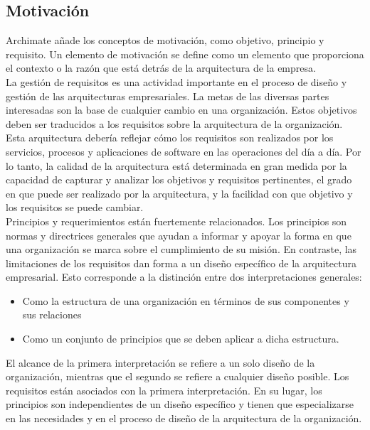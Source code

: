   \subsection{Motivación}
  Archimate añade los conceptos de motivación, como objetivo, principio y requisito. Un elemento de motivación se define como un elemento que proporciona el contexto o la razón que está detrás de la arquitectura de la empresa. \\
  
  La gestión de requisitos es una actividad importante en el proceso de diseño y gestión de las arquitecturas empresariales. La metas de las diversas partes interesadas son la base de cualquier cambio en una organización. Estos objetivos deben ser traducidos a los requisitos sobre la arquitectura de la organización. Esta arquitectura debería reflejar cómo los requisitos son realizados por los servicios, procesos y aplicaciones de software en las operaciones del día a día. Por lo tanto, la calidad de la arquitectura está determinada en gran medida por la capacidad de capturar y analizar los objetivos y requisitos pertinentes, el grado en que puede ser realizado por la arquitectura, y la facilidad con que objetivo y los requisitos se puede cambiar. \\
  
  Principios y requerimientos están fuertemente relacionados. Los principios son normas y directrices generales que ayudan a informar y apoyar la forma en que una organización se marca sobre el cumplimiento de su misión. En contraste, las limitaciones de los requisitos dan forma a un diseño específico de la arquitectura empresarial. Esto corresponde a la distinción entre dos interpretaciones generales:
  \begin{itemize}
  	\item Como la estructura de una organización en términos de sus componentes y sus relaciones
  	\item Como un conjunto de principios que se deben aplicar a dicha estructura.
  \end{itemize}
  El alcance de la primera interpretación se refiere a un solo diseño de la organización, mientras que el segundo se refiere a cualquier diseño posible. Los requisitos están asociados con la primera interpretación. En su lugar, los principios son independientes de un diseño específico y tienen que especializarse en las necesidades y en el proceso de diseño de la arquitectura de la organización. \\
  
